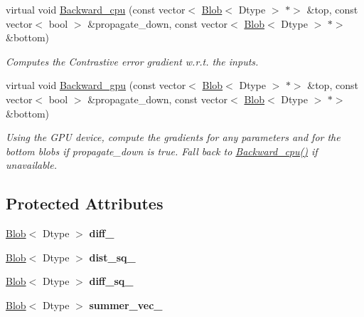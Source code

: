 \begin{DoxyCompactItemize}
virtual void \mbox{\hyperlink{classcaffe_1_1_contrastive_loss_layer_a2c8e0737bba7568b172468be5c33d2a7}{Backward\+\_\+cpu}} (const vector$<$ \mbox{\hyperlink{classcaffe_1_1_blob}{Blob}}$<$ Dtype $>$ $\ast$$>$ \&top, const vector$<$ bool $>$ \&propagate\+\_\+down, const vector$<$ \mbox{\hyperlink{classcaffe_1_1_blob}{Blob}}$<$ Dtype $>$ $\ast$$>$ \&bottom)
\begin{DoxyCompactList}\small\item\em Computes the Contrastive error gradient w.\+r.\+t. the inputs. \end{DoxyCompactList}\item 
\mbox{\label{classcaffe_1_1_contrastive_loss_layer_a1501e5437e3f0929da03a1046559dd06}} 
virtual void \mbox{\hyperlink{classcaffe_1_1_contrastive_loss_layer_a1501e5437e3f0929da03a1046559dd06}{Backward\+\_\+gpu}} (const vector$<$ \mbox{\hyperlink{classcaffe_1_1_blob}{Blob}}$<$ Dtype $>$ $\ast$$>$ \&top, const vector$<$ bool $>$ \&propagate\+\_\+down, const vector$<$ \mbox{\hyperlink{classcaffe_1_1_blob}{Blob}}$<$ Dtype $>$ $\ast$$>$ \&bottom)
\begin{DoxyCompactList}\small\item\em Using the G\+PU device, compute the gradients for any parameters and for the bottom blobs if propagate\+\_\+down is true. Fall back to \mbox{\hyperlink{classcaffe_1_1_contrastive_loss_layer_a60af9729fe340be3ae0f87737215d9d0}{Backward\+\_\+cpu()}} if unavailable. \end{DoxyCompactList}\end{DoxyCompactItemize}
\subsection*{Protected Attributes}
\begin{DoxyCompactItemize}
\item 
\mbox{\label{classcaffe_1_1_contrastive_loss_layer_a2eb9543a04f7a3beb66b3a41bfd0c2b5}} 
\mbox{\hyperlink{classcaffe_1_1_blob}{Blob}}$<$ Dtype $>$ {\bfseries diff\+\_\+}
\item 
\mbox{\label{classcaffe_1_1_contrastive_loss_layer_ae77329ab259285b66bcae6dd4bd9b277}} 
\mbox{\hyperlink{classcaffe_1_1_blob}{Blob}}$<$ Dtype $>$ {\bfseries dist\+\_\+sq\+\_\+}
\item 
\mbox{\label{classcaffe_1_1_contrastive_loss_layer_a9166263402e5f7bbf2f992dbdc879cb3}} 
\mbox{\hyperlink{classcaffe_1_1_blob}{Blob}}$<$ Dtype $>$ {\bfseries diff\+\_\+sq\+\_\+}
\item 
\mbox{\label{classcaffe_1_1_contrastive_loss_layer_a4ccba3740b8c081d7e8ac9302984544d}} 
\mbox{\hyperlink{classcaffe_1_1_blob}{Blob}}$<$ Dtype $>$ {\bfseries summer\+\_\+vec\+\_\+}
\end{DoxyCompactItemize}


